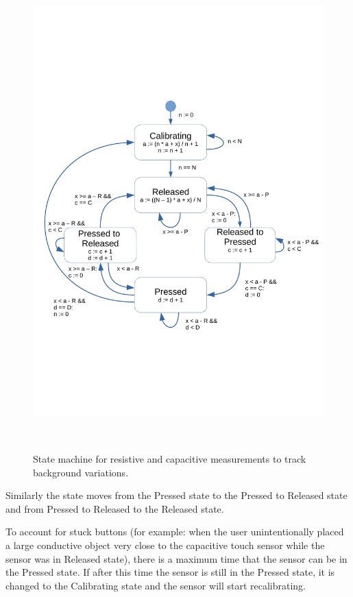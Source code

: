 \documentclass{sigchi-ext}
\begin{document}
\begin{figure}
\centering
\includegraphics[trim={0 6.2cm 0 6.8cm},clip,width=0.9\columnwidth]{figures/state_machine}
 \caption{State machine for resistive and capacitive measurements to track
background variations.}~\label{fig:state_machine}
\end{figure}

Similarly the state moves from the Pressed state to the Pressed to Released
state and from Pressed to Released to the Released state.

To account for stuck buttons (for example: when the user unintentionally placed
a large conductive object very close to the capacitive touch sensor while the
sensor was in Released state), there is a maximum time that the sensor can be in
the Pressed state. If after this time the sensor is still in the Pressed state,
it is changed to the Calibrating state and the sensor will start recalibrating.
\end{document}
